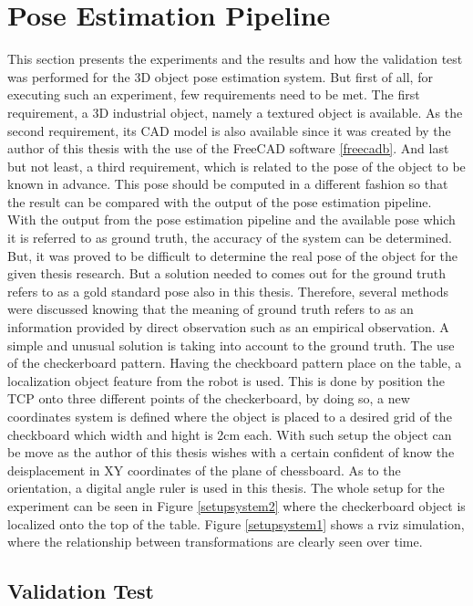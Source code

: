 \section{Pose Estimation Pipeline}

This section presents the experiments and the results and how the validation test was performed for the 3D object pose estimation system. But first of all, for executing such an experiment, few requirements need to be met. The first requirement, a 3D industrial object, namely a textured object is available. As the second requirement, its CAD model is also available since it was created by the author of this thesis with the use of the FreeCAD software \ref{freecadb}. And last but not least, a third requirement, which is related to the pose of the object to be known in advance. This pose should be computed in a different fashion so that the result can be compared with the output of the pose estimation pipeline.\\
With the output from the pose estimation pipeline and the available pose which it is referred to as ground truth, the accuracy of the system can be determined. But, it was proved to be difficult to determine the real pose of the object for the given thesis research. But a solution needed to comes out for the ground truth refers to as a gold standard pose also in this thesis. Therefore, several methods were discussed knowing that the meaning of ground truth refers to as an information provided by direct observation such as an empirical observation. A simple and unusual solution is taking into account to  the ground truth. The use of the checkerboard pattern. Having the checkboard pattern place on the table, a localization object feature from the robot is used. This is done by position the TCP onto three different points of the checkerboard, by doing so, a new coordinates system is defined where the object is placed to a desired grid of the checkboard which width and hight is 2cm each. With such setup the object can be move as the author of this thesis wishes with a certain confident of know the deisplacement in XY coordinates of the plane of chessboard. As to the orientation, a digital angle ruler is used in this thesis. The whole setup for the experiment can be seen in Figure \ref{setupsystem2} where the checkerboard object is localized onto the top of the table. Figure \ref{setupsystem1} shows a rviz simulation, where the relationship between transformations are clearly seen over time. 

\subsection{Validation Test}\label{valitest}

